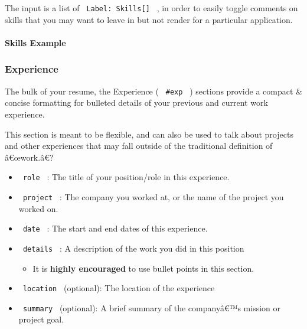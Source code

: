 The input is a list of \texttt{\ Label:\ Skills{[}{]}\ } , in order to
easily toggle comments on skills that you may want to leave in but not
render for a particular application.

\paragraph{Skills Example}\label{skills-example}

\begin{Shaded}
\begin{Highlighting}[]
\NormalTok{  )),}
\NormalTok{    [Delorean OS],}
\NormalTok{    [Windows 1],}
\NormalTok{  )),}
\NormalTok{    [C++],}
\NormalTok{    [C Language],}
\NormalTok{    [MatLab],}
\NormalTok{  )),}
\NormalTok{))}
\end{Highlighting}
\end{Shaded}

\subsubsection{Experience}\label{experience}

The bulk of your resume, the Experience ( \texttt{\ \#exp\ } ) sections
provide a compact \& concise formatting for bulleted details of your
previous and current work experience.

This section is meant to be flexible, and can also be used to talk about
projects and other experiences that may fall outside of the traditional
definition of â€œwork.â€?

\begin{itemize}
\tightlist
\item
  \texttt{\ role\ } : The title of your position/role in this
  experience.
\item
  \texttt{\ project\ } : The company you worked at, or the name of the
  project you worked on.
\item
  \texttt{\ date\ } : The start and end dates of this experience.
\item
  \texttt{\ details\ } : A description of the work you did in this
  position

  \begin{itemize}
  \tightlist
  \item
    It is \textbf{highly encouraged} to use bullet points in this
    section.
  \end{itemize}
\item
  \texttt{\ location\ } (optional): The location of the experience
\item
  \texttt{\ summary\ } (optional): A brief summary of the companyâ€™s
  mission or project goal.
\end{itemize}


